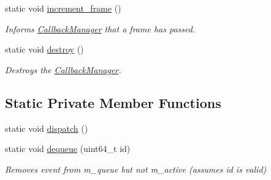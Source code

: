 \begin{DoxyCompactItemize}
\mbox{\label{classnta_1_1CallbackManager_ae055387e26996a024065a5b59c833e78}} 
static void \hyperlink{classnta_1_1CallbackManager_ae055387e26996a024065a5b59c833e78}{increment\+\_\+frame} ()
\begin{DoxyCompactList}\small\item\em Informs \hyperlink{classnta_1_1CallbackManager}{Callback\+Manager} that a frame has passed. \end{DoxyCompactList}\item 
\mbox{\label{classnta_1_1CallbackManager_a70be77ca2505257376250c660a3082d6}} 
static void \hyperlink{classnta_1_1CallbackManager_a70be77ca2505257376250c660a3082d6}{destroy} ()
\begin{DoxyCompactList}\small\item\em Destroys the \hyperlink{classnta_1_1CallbackManager}{Callback\+Manager}. \end{DoxyCompactList}\end{DoxyCompactItemize}
\subsection*{Static Private Member Functions}
\begin{DoxyCompactItemize}
\item 
static void \hyperlink{classnta_1_1CallbackManager_a7912dc908d7a7a44267ddd8fa6fb8686}{dispatch} ()
\item 
\mbox{\label{classnta_1_1CallbackManager_a897df241a317572ff96bb89e28aadc14}} 
static void \hyperlink{classnta_1_1CallbackManager_a897df241a317572ff96bb89e28aadc14}{dequeue} (uint64\+\_\+t id)
\begin{DoxyCompactList}\small\item\em Removes event from m\+\_\+queue but not m\+\_\+active (assumes id is valid) \end{DoxyCompactList}\end{DoxyCompactItemize}
